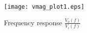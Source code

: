 \begin{figure}[H] \centering
\texttt{[image: vmag\_plot1.eps]}
\caption{Frequency response $\frac{V_o(f)}{V_i(f)}$}
\label{fig:freq_response}
\end{figure}







